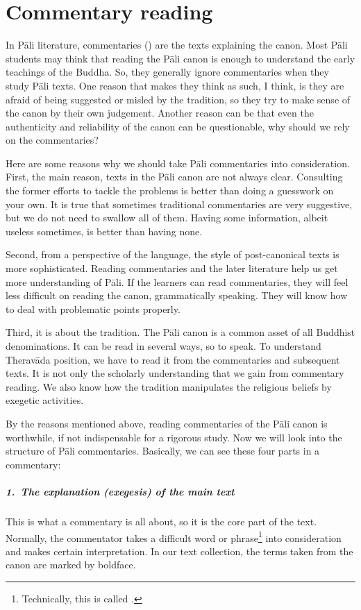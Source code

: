 \chapter{Commentary reading}\label{chap:commentary}

In P\=ali literature, commentaries () are the texts explaining the canon. Most P\=ali students may think that reading the P\=ali canon is enough to understand the early teachings of the Buddha. So, they generally ignore commentaries when they study P\=ali texts. One reason that makes they think as such, I think, is they are afraid of being suggested or misled by the tradition, so they try to make sense of the canon by their own judgement. Another reason can be that even the authenticity and reliability of the canon can be questionable, why should we rely on the commentaries?

Here are some reasons why we should take P\=ali commentaries into consideration. First, the main reason, texts in the P\=ali canon are not always clear. Consulting the former efforts to tackle the problems is better than doing a guesswork on your own. It is true that sometimes traditional commentaries are very suggestive, but we do not need to swallow all of them. Having some information, albeit useless sometimes, is better than having none.

Second, from a perspective of the language, the style of post-canonical texts is more sophisticated. Reading commentaries and the later literature help us get more understanding of P\=ali. If the learners can read commentaries, they will feel less difficult on reading the canon, grammatically speaking. They will know how to deal with problematic points properly.

Third, it is about the tradition. The P\=ali canon is a common asset of all Buddhist denominations. It can be read in several ways, so to speak. To understand Therav\=ada position, we have to read it from the commentaries and subsequent texts. It is not only the scholarly understanding that we gain from commentary reading. We also know how the tradition manipulates the religious beliefs by exegetic activities.

By the reasons mentioned above, reading commentaries of the P\=ali canon is worthwhile, if not indispensable for a rigorous study. Now we will look into the structure of P\=ali commentaries. Basically, we can see these four parts in a commentary:

\paragraph*{1.\ The explanation (exegesis) of the main text} This is what a commentary is all about, so it is the core part of the text. Normally, the commentator takes a difficult word or phrase\footnote{Technically, this is called .} into consideration and makes certain interpretation. In our text collection, the terms taken from the canon are marked by boldface.
